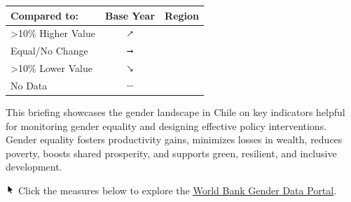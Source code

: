 \documentclass[
]{article}
\author{}
\date{\vspace{-2.5em}}
\begin{document}

\begin{table}\begingroup\fontsize{8}{10}\selectfont

\begin{tabular}[t]{lcl}

\textbf{Compared to:} & \textbf{Base Year} & \textbf{Region}\\
\midrule
>10\% Higher Value & \includegraphics[width=0.1in, height=0.1in]{icon/upicon.png} & \cellcolor[HTML]{21908C}{}\\
Equal/No Change & \includegraphics[width=0.1in, height=0.1in]{icon/righticon.png} & \cellcolor[HTML]{34608D}{}\\
>10\% Lower Value & \includegraphics[width=0.1in, height=0.1in]{icon/downicon.png} & \cellcolor[HTML]{482576}{}\\
No Data & \includegraphics[width=0.1in, height=0.1in]{icon/naicon.png} & \cellcolor{gray}{}\\

\end{tabular}
\endgroup{}\end{table}

\begin{minipage}[t][1.7cm][t]{12cm}
\fontsize{9}{8}\selectfont\raggedright
This briefing showcases the gender landscape in Chile on key indicators helpful for monitoring gender equality and designing effective policy interventions. Gender equality fosters productivity gains, minimizes losses in wealth, reduces poverty, boosts shared prosperity, and supports green, resilient, and inclusive development. 

\includegraphics[width=10pt]{icon/pointer.png} Click the measures below to explore the \underline{\href{https://genderdata.worldbank.org/}{World Bank Gender Data Portal}}.
\end{minipage}
\vspace{6pt}
\end{document}
